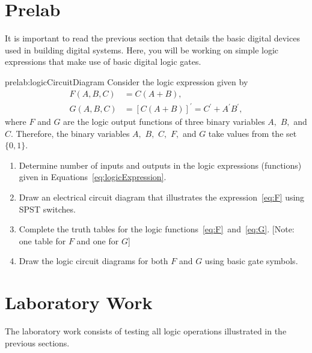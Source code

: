 \section{Prelab}
\label{sec:prelab}
It is important to read the previous section that details the basic digital devices used in building digital systems. Here, you will be working on simple logic expressions that make use of basic digital logic gates.  


\begin{prelab}{prelab:logicCircuitDiagram}
  Consider the logic expression given by
  \begin{subequations}
  \label{eq:logicExpression}    
  \begin{align}
    \label{eq:F}
    F(A,B,C)&=C(A+B),\\
    \label{eq:G}
    G(A,B,C)&=\left[C(A+B)\right]^{'} = C^{'}+A^{'}B^{'},
  \end{align}    
  \end{subequations}
%
where $F$ and $G$ are the logic output functions of three binary variables $A,$ $B,$ and $C.$ Therefore, the binary variables $A,$ $B,$ $C,$ $F,$ and $G$ take values from the set $\{0,1\}.$
\begin{enumerate}
\item Determine number of inputs and outputs in the logic expressions (functions) given in Equations~\eqref{eq:logicExpression}.
\item Draw an electrical circuit diagram that illustrates the expression~\eqref{eq:F} using SPST switches.
\item Complete  the truth tables for the logic functions~\eqref{eq:F}~and~\eqref{eq:G}. [Note: one table for $F$ and one for $G$]
\item Draw the logic circuit diagrams for both $F$ and $G$ using basic gate symbols.
\end{enumerate}
\end{prelab}



\section{Laboratory Work}
The laboratory work consists of testing all logic operations illustrated in the previous sections. 


